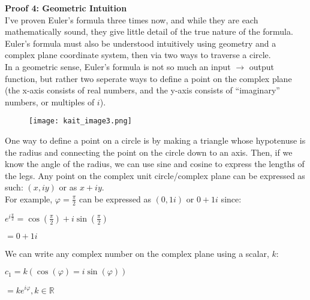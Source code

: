 \documentclass{article}
\theoremstyle{definition}
\begin{document}
\vspace{5mm} %
\noindent
\textbf{Proof 4: Geometric Intuition}
\vspace{5mm} %
\\
\noindent
I’ve proven Euler’s formula three times now, and while they are each mathematically sound, they give little detail of the true nature of the formula. Euler’s formula must also be understood intuitively using geometry and a complex plane coordinate system, then via two ways to traverse a circle. 
\vspace{5mm} %
\\
\noindent
In a geometric sense, Euler’s formula is not so much an input $\rightarrow$ output function, but rather two seperate ways to define a point on the complex plane (the x-axis consists of real numbers, and the y-axis consists of “imaginary” numbers, or multiples of $i$).

\begin{figure}[h!]
\begin{center}
\texttt{[image: kait\_image3.png]} 
\end{center}
\end{figure}


\noindent
One way to define a point on a circle is by making a triangle whose hypotenuse is the radius and connecting the point on the circle down to an axis. Then, if we know the angle of the radius, we can use sine and cosine to express the lengths of the legs. Any point on the complex unit circle/complex plane can be expressed as such: $(x, iy)$ or as $x+iy$.
\vspace{5mm} %
\\
\noindent
For example, $\varphi = \frac{\pi}{2}$ can be expressed as $(0, 1i)$ or $0 + 1i$ since:

\begin{center}
$e^{i\frac{\pi}{2}} = \cos (\frac{\pi}{2}) + i\sin (\frac{\pi}{2})$

$=0+1i$
\end{center}


\noindent
We can write any complex number on the complex plane using a scalar, $k$:

\begin{center}
$c_1 = k(\cos (\varphi) = i\sin (\varphi))$

$= ke^{i\varphi}, k \in \mathbb{R}$
\end{center}
\end{document}
